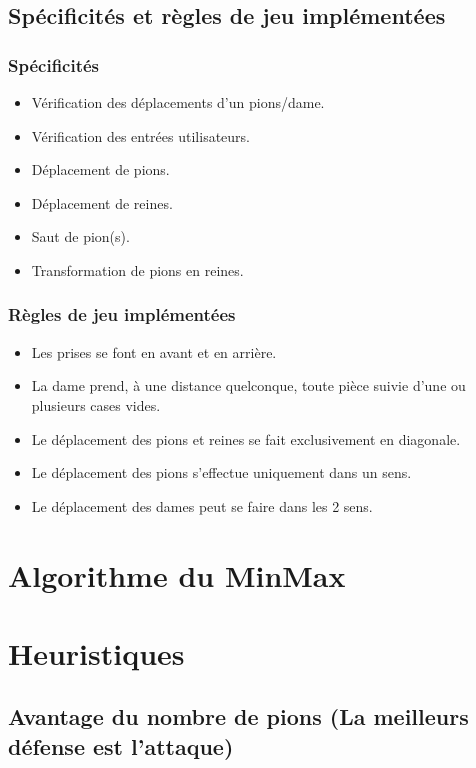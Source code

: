 \documentclass[10pt,a4paper]{report}
\begin{document}
	\subsection{Spécificités et règles de jeu implémentées}
		\subsubsection{Spécificités}
		
		\begin{itemize}[label = $\blacktriangleright$]
		\item Vérification des déplacements d'un pions/dame.
		\item Vérification des entrées utilisateurs.
		\item Déplacement de pions.
		\item Déplacement de reines.
		\item Saut de pion(s).
		\item Transformation de pions en reines.
		\end{itemize}
		
		\subsubsection{Règles de jeu implémentées}
		
		\begin{itemize}[label = $\blacktriangleright$]
		\item Les prises se font en avant et en arrière.
		\item La dame prend, à une distance quelconque, toute pièce suivie d'une ou plusieurs cases vides.
		\item Le déplacement des pions et reines se fait exclusivement en diagonale.
		\item Le déplacement des pions s'effectue uniquement dans un sens.
		\item Le déplacement des dames peut se faire dans les 2 sens. 
		\end{itemize}
\section{Algorithme du MinMax}

\section{Heuristiques}

	\subsection{Avantage du nombre de pions (La meilleurs défense est l'attaque) }
	
\end{document}
